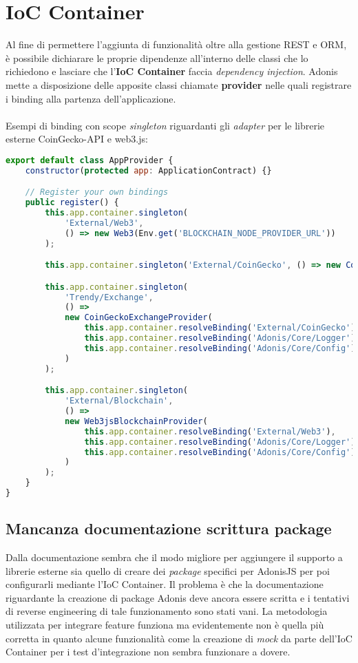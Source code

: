 \section{IoC Container}
\label{impl:ioc}
Al fine di permettere l'aggiunta di funzionalità oltre alla gestione REST e ORM, è possibile dichiarare le proprie dipendenze all'interno delle classi che lo richiedono e lasciare che l'\textbf{IoC Container} faccia \textit{dependency injection}. Adonis mette a disposizione delle apposite classi chiamate \textbf{provider} nelle quali registrare i binding alla partenza dell'applicazione.
\\\\
Esempi di binding con scope \textit{singleton} riguardanti gli \textit{adapter} per le librerie esterne CoinGecko-API e web3.js:
\begin{lstlisting}[language=JavaScript]
export default class AppProvider {
    constructor(protected app: ApplicationContract) {}

    // Register your own bindings
    public register() {
        this.app.container.singleton(
            'External/Web3',
            () => new Web3(Env.get('BLOCKCHAIN_NODE_PROVIDER_URL'))
        );

        this.app.container.singleton('External/CoinGecko', () => new CoinGecko());

        this.app.container.singleton(
            'Trendy/Exchange',
            () =>
            new CoinGeckoExchangeProvider(
                this.app.container.resolveBinding('External/CoinGecko'),
                this.app.container.resolveBinding('Adonis/Core/Logger'),
                this.app.container.resolveBinding('Adonis/Core/Config')
            )
        );

        this.app.container.singleton(
            'External/Blockchain',
            () =>
            new Web3jsBlockchainProvider(
                this.app.container.resolveBinding('External/Web3'),
                this.app.container.resolveBinding('Adonis/Core/Logger'),
                this.app.container.resolveBinding('Adonis/Core/Config')
            )
        );
    }
}
\end{lstlisting}

\newpage

    \subsection{Mancanza documentazione scrittura package}
    \label{impl:ioc:no-docs}
    Dalla documentazione sembra che il modo migliore per aggiungere il supporto a librerie esterne sia quello di creare dei \textit{package} specifici per AdonisJS per poi configurarli mediante l'IoC Container. Il problema è che la documentazione riguardante la creazione di package Adonis deve ancora essere scritta e i tentativi di reverse engineering di tale funzionamento sono stati vani. La metodologia utilizzata per integrare feature funziona ma evidentemente non è quella più corretta in quanto alcune funzionalità come la creazione di \textit{mock} da parte dell'IoC Container per i test d'integrazione non sembra funzionare a dovere.

